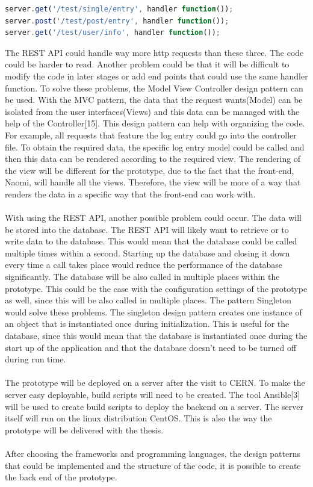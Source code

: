 \documentclass[paper=a4, fontsize=11pt,twoside]{scrartcl}	%
\begin{document}
\begin{lstlisting}[language=JavaScript, frame=single]
server.get('/test/single/entry', handler function());
server.post('/test/post/entry', handler function());
server.get('/test/user/info', handler function());
\end{lstlisting} 
The REST API could handle way more http requests than these three. The code could be harder to read. Another problem could be that it will be difficult to modify the code in later stages or add end points that could use the same handler function. To solve these problems, the Model View Controller design pattern can be used. With the MVC pattern, the data that the request wants(Model) can be isolated from the user interfaces(Views) and this data can be managed with the help of the Controller[15]. This design pattern can help with organizing the code. For example, all requests that feature the log entry could go into the controller file. To obtain the required data, the specific log entry model could be called and then this data can be rendered according to the required view. The rendering of the view will be different for the prototype, due to the fact that the front-end, Naomi, will handle all the views. Therefore, the view will be more of a way that renders the data in a specific way that the front-end can work with.\\ \\
With using the REST API, another possible problem could occur. The data will be stored into the database. The REST API will likely want to retrieve or to write data to the database. This would mean that the database could be called multiple times within a second. Starting up the database and closing it down every time a call takes place would reduce the performance of the database significantly. The database will be also called in multiple places within the prototype. This could be the case with the configuration settings of the prototype as well, since this will be also called in multiple places. The pattern Singleton would solve these problems. The singleton design pattern creates one instance of an object that is instantiated once during initialization. This is useful for the database, since this would mean that the database is instantiated once during the start up of the application and that the database doesn't need to be turned off during run time. \\ \\
The prototype will be deployed on a server after the visit to CERN. To make the server easy deployable, build scripts will need to be created. The tool Ansible[3] will be used to create build scripts to deploy the backend on a server. The server itself will run on the linux distribution CentOS. This is also the way the prototype will be delivered with the thesis. \\ \\
After choosing the frameworks and programming languages, the design patterns that could be implemented and the structure of the code, it is possible to create the back end of the prototype.   
\end{document}
